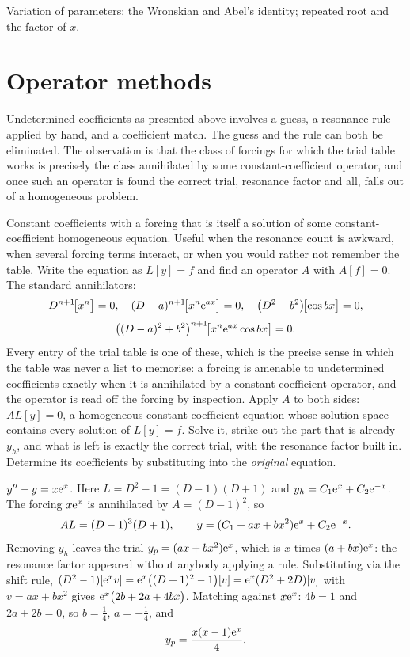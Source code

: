 \begin{seealsob}Variation of parameters; the Wronskian and Abel's identity; repeated root and the factor of $x$.\end{seealsob}

\section{Operator methods}

Undetermined coefficients as presented above involves a guess, a resonance rule applied by hand, and a coefficient match. The guess and the rule can both be eliminated. The observation is that the class of forcings for which the trial table works is precisely the class annihilated by some constant-coefficient operator, and once such an operator is found the correct trial, resonance factor and all, falls out of a homogeneous problem.

\cue Constant coefficients with a forcing that is itself a solution of some constant-coefficient homogeneous equation. Useful when the resonance count is awkward, when several forcing terms interact, or when you would rather not remember the table.
\method Write the equation as $L[y]=f$ and find an operator $A$ with $A[f]=0$. The standard annihilators:
\[D^{n+1}\!\bigl[x^{n}\bigr]=0,\quad (D-a)^{n+1}\!\bigl[x^{n}\mathrm{e}^{ax}\bigr]=0,\quad \bigl(D^{2}+b^{2}\bigr)\!\bigl[\cos bx\bigr]=0,\]
\[\bigl((D-a)^{2}+b^{2}\bigr)^{n+1}\!\bigl[x^{n}\mathrm{e}^{ax}\cos bx\bigr]=0.\]
Every entry of the trial table is one of these, which is the precise sense in which the table was never a list to memorise: a forcing is amenable to undetermined coefficients exactly when it is annihilated by a constant-coefficient operator, and the operator is read off the forcing by inspection.
Apply $A$ to both sides: $AL[y]=0$, a homogeneous constant-coefficient equation whose solution space contains every solution of $L[y]=f$. Solve it, strike out the part that is already $y_h$, and what is left is exactly the correct trial, with the resonance factor built in. Determine its coefficients by substituting into the \emph{original} equation.

\begin{worked}
$y''-y=x\mathrm{e}^{x}$. Here $L=D^{2}-1=(D-1)(D+1)$ and $y_h=C_1\mathrm{e}^{x}+C_2\mathrm{e}^{-x}$. The forcing $x\mathrm{e}^{x}$ is annihilated by $A=(D-1)^{2}$, so
\[AL=(D-1)^{3}(D+1),\qquad y=(C_1+ax+bx^{2})\mathrm{e}^{x}+C_2\mathrm{e}^{-x}.\]
Removing $y_h$ leaves the trial $y_p=(ax+bx^{2})\mathrm{e}^{x}$, which is $x$ times $(a+bx)\mathrm{e}^{x}$: the resonance factor appeared without anybody applying a rule. Substituting via the shift rule, $(D^{2}-1)[\mathrm{e}^{x}v]=\mathrm{e}^{x}\bigl((D+1)^{2}-1\bigr)[v]=\mathrm{e}^{x}(D^{2}+2D)[v]$ with $v=ax+bx^{2}$ gives $\mathrm{e}^{x}\bigl(2b+2a+4bx\bigr)$. Matching against $x\mathrm{e}^{x}$: $4b=1$ and $2a+2b=0$, so $b=\tfrac14$, $a=-\tfrac14$, and
\[y_p=\frac{x(x-1)\mathrm{e}^{x}}{4}.\]
\end{worked}

